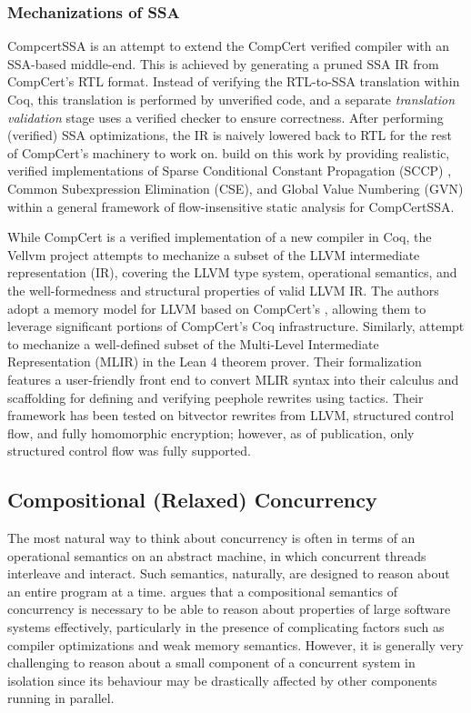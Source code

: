 \documentclass[acmsmall,screen,review]{acmart}
\begin{document}
\subsubsection{Mechanizations of SSA}


CompcertSSA \cite{compcert-ssa-12} is an attempt to extend the CompCert verified compiler
\cite{leroy-compcert-09} with an SSA-based middle-end. This is achieved by generating a pruned SSA
IR from CompCert's RTL format. Instead of verifying the RTL-to-SSA translation within Coq, this
translation is performed by unverified code, and a separate \emph{translation validation} stage uses
a verified checker to ensure correctness. After performing (verified) SSA optimizations, the IR is
naively lowered back to RTL for the rest of CompCert's machinery to work on. \citet{demange-ssa-15} build on this work by providing realistic, verified implementations of Sparse Conditional Constant Propagation (SCCP) \cite{wegman-sccp-91}, Common Subexpression Elimination (CSE), and Global Value Numbering (GVN) \cite{rosen-gvn-1988} within a general framework of flow-insensitive static analysis for CompCertSSA.

While CompCert is a verified implementation of a new compiler in Coq, the Vellvm project
\cite{vellvm-12} attempts to mechanize a subset of the LLVM intermediate representation (IR),
covering the LLVM type system, operational semantics, and the well-formedness and structural
properties of valid LLVM IR. The authors adopt a memory model for LLVM based on CompCert's
\cite{leroy-compcert-09}, allowing them to leverage significant portions of CompCert's Coq
infrastructure. Similarly, \citet{siddharth-24-peephole} attempt to mechanize a well-defined subset
of the Multi-Level Intermediate Representation (MLIR) in the Lean 4 theorem prover. Their
formalization features a user-friendly front end to convert MLIR syntax into their calculus and
scaffolding for defining and verifying peephole rewrites using tactics. Their framework has been
tested on bitvector rewrites from LLVM, structured control flow, and fully homomorphic encryption;
however, as of publication, only structured control flow was fully supported.

\subsection{Compositional (Relaxed) Concurrency}

The most natural way to think about concurrency is often in terms of an operational semantics on an
abstract machine, in which concurrent threads interleave and interact. Such semantics, naturally,
are designed to reason about an entire program at a time. \citet{batty-compositional-17} argues that
a compositional semantics of concurrency is necessary to be able to reason about properties of large
software systems effectively, particularly in the presence of complicating factors such as compiler
optimizations and weak memory semantics. However, it is generally very challenging to reason about a
small component of a concurrent system in isolation since its behaviour may be drastically affected
by other components running in parallel.
\end{document}
